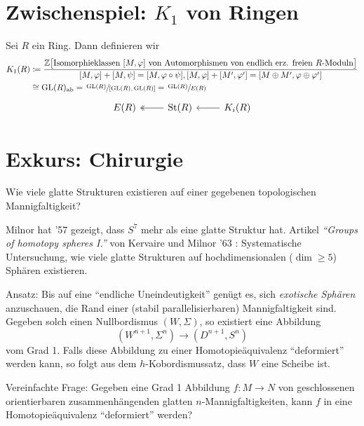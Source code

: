 \section*{Zwischenspiel: $K_1$ von Ringen}
Sei $R$ ein Ring.
Dann definieren wir 
\begin{align}
	K_1(R) &\coloneqq \frac{\mathbb{Z} \benbrace[\big]{\text{Isomorphieklassen $[M,\varphi]$ von Automorphismen von endlich erz. freien $R$-Moduln} }}{[M,\varphi] + [M,\psi] = \benbrace*{M, \varphi \circ \psi}, [M,\varphi] + [M',\varphi'] = \benbrace*{M \oplus M', \varphi \oplus \varphi'}}  \\
	&\cong \GL(R)_{\ab} = \sfrac{\GL(R)}{\benbrace*{\GL(R), \GL(R)}} = \sfrac{\GL(R)}{E(R)}
\end{align}
\[
	\begin{tikzcd}
		E(R) & \operatorname{St}(R) \lar[two heads] & K_i(R) \lar
	\end{tikzcd}
\]





\newpage




\section{Exkurs: Chirurgie} %
\label{sec:7}

\begin{frage}
	Wie viele glatte Strukturen existieren auf einer gegebenen topologischen Mannigfaltigkeit?
\end{frage}

Milnor hat '57 gezeigt, dass $S^7$ mehr als eine glatte Struktur hat. 
Artikel \emph{\enquote{Groups of homotopy spheres I.}} von Kervaire und Milnor '63 : Systematische Untersuchung, wie viele glatte Strukturen auf hochdimensionalen ($\dim \ge 5$) Sphären existieren. 

Ansatz: Bis auf eine \enquote{endliche Uneindeutigkeit} genügt es, sich \emph{exotische Sphären} anzuschauen, die Rand einer (stabil parallelisierbaren) Mannigfaltigkeit sind.
Gegeben solch einen Nullbordismus $(W,\Sigma)$, so existiert eine Abbildung 
\[
	(W^{n+1},\Sigma^n) \longrightarrow (D^{n+1},S^n) 
\]
vom Grad 1. 
Falls diese Abbildung zu einer Homotopieäquivalenz \enquote{deformiert} werden kann, so folgt aus dem $h$-Kobordismussatz, dass $W$ eine Scheibe ist.

Vereinfachte Frage: Gegeben eine Grad 1 Abbildung $f \colon M \to N$ von geschlossenen orientierbaren zusammenhängenden glatten $n$-Mannigfaltigkeiten, kann $f$ in eine Homotopieäquivalenz \enquote{deformiert} werden?

